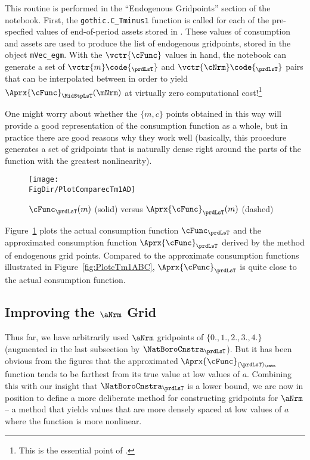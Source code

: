 \documentclass[\econtexRoot/SolvingMicroDSOPs]{subfiles}
\begin{document}
This routine is performed in the ``Endogenous Gridpoints'' section of the notebook. First, the \texttt{gothic.C\_Tminus1} function is called for each of the pre-specfied values of end-of-period assets stored in . These values of consumption and assets are used to produce the list of endogenous gridpoints, stored in the object \texttt{mVec\_egm}. With the $\vctr{\cFunc}$ values in hand, the notebook can generate a set of $\vctr{{m}}\code{_{\prdLsT}}$ and ${\vctr{{\cNrm}}\code{_{\prdLsT}}}$ pairs that can be interpolated between in order to yield $\Aprx{\cFunc}_{\MidStpLsT}(\mNrm)$ at virtually zero computational cost!\footnote{This is the essential point of \cite{carrollEGM}.} %

\hypertarget{PlotComparecTm1AD}{}
One might worry about whether the $\{{m},{c}\}$ points obtained in this way will provide a good representation of the consumption function as a whole, but in practice there are good reasons why they work well (basically, this procedure generates a set of gridpoints that is naturally dense right around the parts of the function with the greatest nonlinearity).
\begin{figure}
  \centerline{\texttt{[image: \\FigDir/PlotComparecTm1AD]}}
  \caption{$\cFunc_{\prdLsT}({m})$ (solid) versus $\Aprx{\cFunc}_{\prdLsT}({m})$ (dashed)}
  \label{fig:ComparecTm1AD}
\end{figure}
Figure~\ref{fig:ComparecTm1AD} plots the actual consumption function ${\cFunc}_{\prdLsT}$ and the approximated consumption function $\Aprx{\cFunc}_{\prdLsT}$ derived by the method of endogenous grid points. Compared to the approximate consumption functions illustrated in Figure~\ref{fig:PlotcTm1ABC}, $\Aprx{\cFunc}_{\prdLsT}$ is quite close to the actual consumption function.



\hypertarget{improving-the-a-grid}{}
\subsection{Improving the $\aNrm$ Grid}\label{subsec:improving-the-a-grid}

Thus far, we have arbitrarily used $\aNrm$ gridpoints of $\{0.,1.,2.,3.,4.\}$ (augmented in the last subsection by $\NatBoroCnstra_{\prdLsT}$).  But it has been obvious from the figures that the approximated $\Aprx{\cFunc}_{({\prdLsT})_\cntn}$ function tends to be farthest from its true value at low values of ${a}$.  Combining this with our insight that $\NatBoroCnstra_{\prdLsT}$ is a lower bound, we are now in position to define a more deliberate method for constructing gridpoints for $\aNrm$ -- a method that yields values that are more densely spaced at low values of ${a}$ where the function is more nonlinear.
\end{document}
